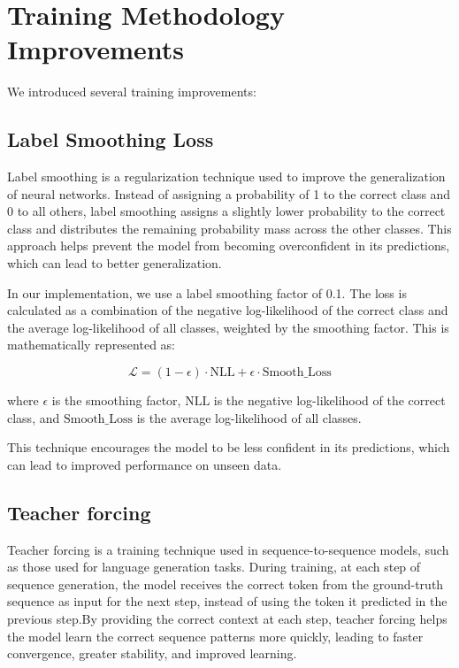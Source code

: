 \documentclass{article}
\theoremstyle{plain}
\theoremstyle{definition}
\theoremstyle{remark}
\begin{document}
\section{Training Methodology Improvements}

We introduced several training improvements:

\subsection{Label Smoothing Loss}

Label smoothing is a regularization technique used to improve the generalization of neural networks. Instead of assigning a probability of 1 to the correct class and 0 to all others, label smoothing assigns a slightly lower probability to the correct class and distributes the remaining probability mass across the other classes. This approach helps prevent the model from becoming overconfident in its predictions, which can lead to better generalization.

In our implementation, we use a label smoothing factor of 0.1. The loss is calculated as a combination of the negative log-likelihood of the correct class and the average log-likelihood of all classes, weighted by the smoothing factor. This is mathematically represented as:

\begin{equation}
\mathcal{L} = (1 - \epsilon) \cdot \text{NLL} + \epsilon \cdot \text{Smooth\_Loss}
\end{equation}

where \(\epsilon\) is the smoothing factor, \(\text{NLL}\) is the negative log-likelihood of the correct class, and \(\text{Smooth\_Loss}\) is the average log-likelihood of all classes.

This technique encourages the model to be less confident in its predictions, which can lead to improved performance on unseen data.
    
\subsection{Teacher forcing} Teacher forcing is a training technique used in sequence-to-sequence models, such as those used for language generation tasks. During training, at each step of sequence generation, the model receives the correct token from the ground-truth sequence as input for the next step, instead of using the token it predicted in the previous step.By providing the correct context at each step, teacher forcing helps the model learn the correct sequence patterns more quickly, leading to faster convergence, greater stability, and improved learning.
    
\end{document}
